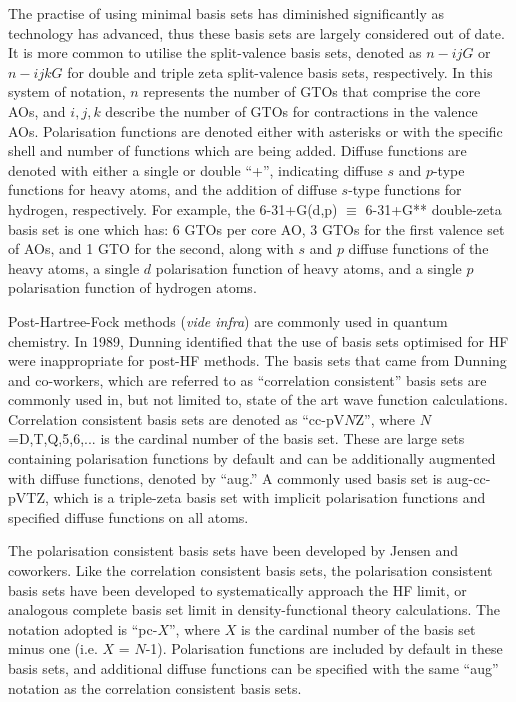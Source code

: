 The practise of using minimal basis sets has diminished significantly as
technology has advanced, thus these basis sets are largely considered out of
date. It is more common to utilise the split-valence basis sets, denoted as
$n-ijG$ or $n-ijkG$ for double and triple zeta split-valence basis sets,
respectively. In this system of notation, $n$ represents the number of GTOs that
comprise the core AOs, and $i, j, k$ describe the number of GTOs for
contractions in the valence AOs. Polarisation functions are denoted either with
asterisks or with the specific shell and number of functions which are being
added. Diffuse functions are denoted with either a single or double ``+'',
indicating diffuse $s$ and $p$-type functions for heavy atoms, and the addition
of diffuse $s$-type functions for hydrogen, respectively. For example, the
6-31+G(d,p) $\equiv$ 6-31+G** double-zeta basis set is one which has: 6 GTOs per
core AO, 3 GTOs for the first valence set of AOs, and 1 GTO for the second,
along with $s$ and $p$ diffuse functions of the heavy atoms, a single $d$
polarisation function of heavy atoms, and a single $p$ polarisation function of
hydrogen atoms.

\vspace{3mm}
\vspace{1mm}

Post-Hartree-Fock methods (\emph{vide infra}) are commonly used in quantum
chemistry. In 1989, Dunning\cite{Dunning1989} identified that the use of basis
sets optimised for HF were inappropriate for post-HF methods. The basis sets
that came from Dunning and co-workers, which are referred to as ``correlation
consistent'' basis sets are commonly used in, but not limited to, state of the
art wave function calculations. Correlation consistent basis sets are denoted as
``cc-pV$N$Z'', where $N$=D,T,Q,5,6,... is the cardinal number of the basis
set. These are large sets containing polarisation functions by default and can
be additionally augmented with diffuse functions, denoted by ``aug.'' A commonly
used basis set is aug-cc-pVTZ, which is a triple-zeta basis set with implicit
polarisation functions and specified diffuse functions on all atoms.

\vspace{3mm}
\vspace{1mm}

The polarisation consistent basis sets have been developed by Jensen and
coworkers.\cite{Jensen2001} Like the correlation consistent basis sets, the
polarisation consistent basis sets have been developed to systematically
approach the HF limit, or analogous complete basis set limit in
density-functional theory calculations. The notation adopted is ``pc-$X$'',
where $X$ is the cardinal number of the basis set minus one (i.e. $X$ = $N$-1).
Polarisation functions are included by default in these basis sets, and
additional diffuse functions can be specified with the same ``aug'' notation as
the correlation consistent basis sets.

